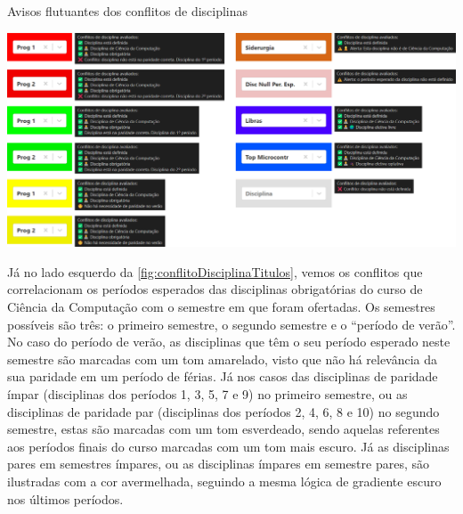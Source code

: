 \begin{MyCenteredFigure}
  \caption{Avisos flutuantes dos conflitos de disciplinas}
  \label{fig:conflitoDisciplinaTitulos}
  \includegraphics[width=\textwidth]{files/img/2.02!5-desenvolvimento/2.02!5.1.5-conflitos/Categorias Disciplinas}
\end{MyCenteredFigure}

Já no lado esquerdo da \autoref{fig:conflitoDisciplinaTitulos}, vemos os conflitos que correlacionam os períodos esperados das disciplinas obrigatórias do curso de Ciência da Computação com o semestre em que foram ofertadas. Os semestres possíveis são três: o primeiro semestre, o segundo semestre e o ``período de verão''. No caso do período de verão, as disciplinas que têm o seu período esperado neste semestre são marcadas com um tom amarelado, visto que não há relevância da sua paridade em um período de férias. Já nos casos das disciplinas de paridade ímpar (disciplinas dos períodos 1, 3, 5, 7 e 9) no primeiro semestre, ou as disciplinas de paridade par (disciplinas dos períodos 2, 4, 6, 8 e 10) no segundo semestre, estas são marcadas com um tom esverdeado, sendo aquelas referentes aos períodos finais do curso marcadas com um tom mais escuro. Já as disciplinas pares em semestres ímpares, ou as disciplinas ímpares em semestre pares, são ilustradas com a cor avermelhada, seguindo a mesma lógica de gradiente escuro nos últimos períodos.

